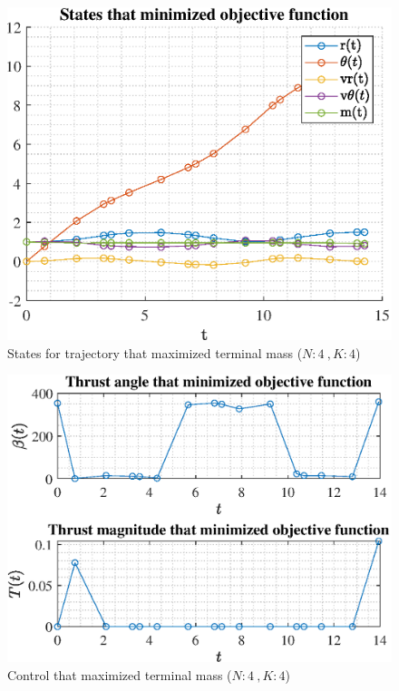 \documentclass[]{article}
\begin{document}
\begin{figure}
	\centering
	\includegraphics[scale=0.75]{states_N4_K4_C3_mf.eps}
	\caption{States for trajectory that maximized terminal mass (\(N:4\ , K:4\))}
	\label{fig:states_N4_K4_C3_mf}
\end{figure}
\begin{figure}
	\centering
	\includegraphics[scale=0.75]{control_N4_K4_C3_mf.eps}
	\caption{Control that maximized terminal mass (\(N:4\ , K:4\))}
	\label{fig:control_N4_K4_C3_mf}
\end{figure}
\end{document}
